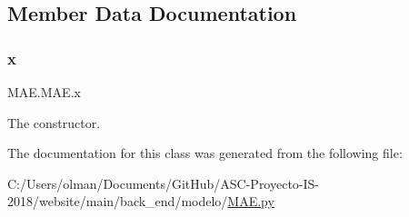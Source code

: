 \subsection{Member Data Documentation}
\mbox{\label{class_m_a_e_1_1_m_a_e_ae516329fc350a56b5a50fe0b922aa6fa}} 
\subsubsection{\texorpdfstring{x}{x}}
{\footnotesize\ttfamily M\+A\+E.\+M\+A\+E.\+x}



The constructor. 



The documentation for this class was generated from the following file\+:\begin{DoxyCompactItemize}
\item 
C\+:/\+Users/olman/\+Documents/\+Git\+Hub/\+A\+S\+C-\/\+Proyecto-\/\+I\+S-\/2018/website/main/back\+\_\+end/modelo/\mbox{\hyperlink{_m_a_e_8py}{M\+A\+E.\+py}}\end{DoxyCompactItemize}
